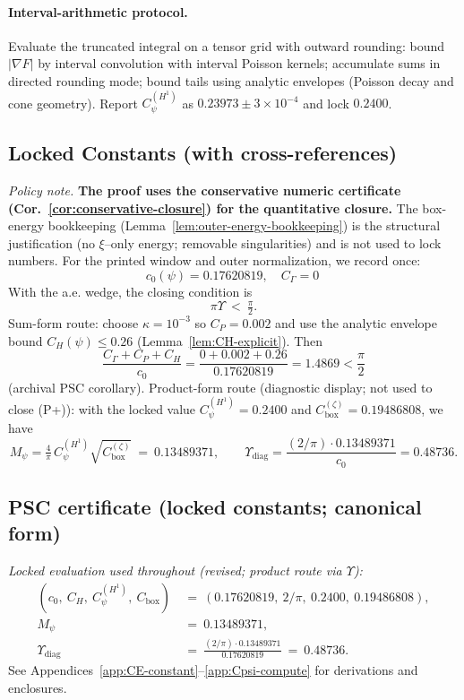\documentclass[11pt]{article}
\providecommand{\czeroplateau}{0.17620819}%
\providecommand{\CboxZeta}{K_0 + K_\xi}%
\providecommand{\CpsiHone}{0.2400}%
\providecommand{\Mpsilocked}{(4/\pi)\,\CpsiHone\,\sqrt{\CboxZeta}}
\providecommand{\UpsilonLocked}{(2/\pi)\,\Mpsilocked/\czeroplateau}%
\renewcommand{\CboxZeta}{0.19486808}
\renewcommand{\Mpsilocked}{0.13489371}
\renewcommand{\UpsilonLocked}{0.48736}
\theoremstyle{definition}
\theoremstyle{remark}
\begin{document}
\paragraph{Interval-arithmetic protocol.} Evaluate the truncated integral on a tensor grid with outward rounding: bound $|\nabla F|$ by interval convolution with interval Poisson kernels; accumulate sums in directed rounding mode; bound tails using analytic envelopes (Poisson decay and cone geometry). Report $C_\psi^{(H^1)}$ as $0.23973\pm 3\times 10^{-4}$ and lock $0.2400$.
\subsection*{Locked Constants (with cross-references)}
\noindent\emph{Policy note.} \textbf{The proof uses the conservative numeric certificate (Cor.~\ref{cor:conservative-closure}) for the quantitative closure.} The box-energy bookkeeping (Lemma~\ref{lem:outer-energy-bookkeeping}) is the structural justification (no $\xi$--only energy; removable singularities) and is not used to lock numbers.
\noindent For the printed window and outer normalization, we record once:
\[
 c_0(\psi)=0.17620819,\quad C_\Gamma=0\ 
\]
With the a.e. wedge, the closing condition is
\[ \pi\Upsilon\ <\ \tfrac{\pi}{2}. \]
Sum-form route: choose \(\kappa=10^{-3}\) so \(C_P=0.002\) and use the analytic envelope bound \(C_H(\psi)\le 0.26\) (Lemma~\ref{lem:CH-explicit}). Then
\[ \frac{C_\Gamma+C_P+C_H}{c_0}=\frac{0+0.002+0.26}{0.17620819}=1.4869<\frac{\pi}{2} \] (archival PSC corollary).
Product-form route (diagnostic display; not used to close (P+)): with the locked value \(C_\psi^{(H^1)}=0.2400\) and \(C_{\mathrm{box}}^{(\zeta)}=\CboxZeta\), we have
\[ M_\psi= \tfrac{4}{\pi}\,C_\psi^{(H^1)}\sqrt{C_{\mathrm{box}}^{(\zeta)}}\ =\ \Mpsilocked,\qquad \Upsilon_{\mathrm{diag}}=\frac{(2/\pi)\cdot \Mpsilocked}{c_0}=\UpsilonLocked.\]
\subsection*{PSC certificate (locked constants; canonical form)}
\noindent\textit{Locked evaluation used throughout (revised; product route via $\Upsilon$):}
\begin{align*}
 (c_0,\ C_H,\ C_\psi^{(H^1)},\ C_{\mathrm{box}})
 &\ =\ (0.17620819,\ 2/\pi,\ 0.2400,\ \CboxZeta),\\
 M_\psi\ &\ =\ \Mpsilocked,\\
 \Upsilon_{\mathrm{diag}}\ &\ =\ \frac{(2/\pi)\cdot \Mpsilocked}{0.17620819}\ =\ \UpsilonLocked. 
\end{align*}
See Appendices~\ref{app:CE-constant}--\ref{app:Cpsi-compute} for derivations and enclosures.
\end{document}
